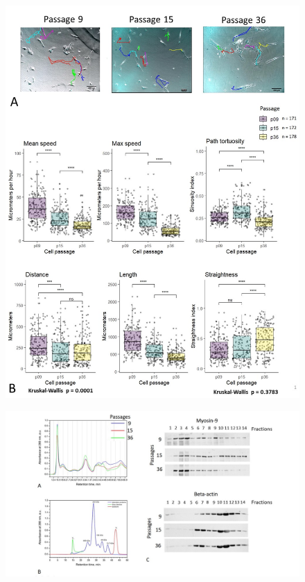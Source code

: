 \documentclass[alpha-refs]{wiley-article}
\begin{document}
\begin{figure}[hbt!]
  \includegraphics[width=1\linewidth]{traj.jpg}
  \caption{}
  \centering
\end{figure}

\begin{figure}[hbt!]
\centering
\includegraphics[width=1\linewidth]{fplc.jpg}
\caption{}
\end{figure}
\end{document}
